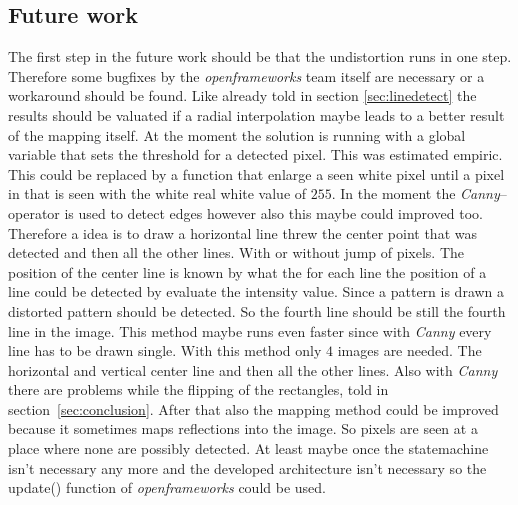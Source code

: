 \documentclass[journal,final,a4paper,twoside]{PS}
\begin{document}
\subsection{Future work}
\label{sec:future}
The first step in the future work should be that the undistortion runs in one step. Therefore some bugfixes by the \emph{openframeworks} team itself are necessary or a workaround should be found. Like already told in section \ref{sec:linedetect} the results should be valuated if a radial interpolation maybe leads to a better result of the mapping itself. At the moment the solution is running with a global variable that sets the threshold for a detected pixel. This was estimated empiric. This could be replaced by a function that enlarge a seen white pixel until a pixel in that is seen with the white real white value of $255$. In the moment the \emph{Canny}--operator is used to detect edges however also this maybe could improved too. Therefore a idea is to draw a horizontal line threw the center point that was detected and then all the other lines. With or without jump of pixels. The position of the center line is known by what the for each line the position of a line could be detected by evaluate the intensity value. Since a pattern is drawn a distorted pattern should be detected. So the fourth line should be still the fourth line in the image. This method maybe runs even faster since with \emph{Canny} every line has to be drawn single. With this method only $4$ images are needed. The horizontal and vertical center line and then all the other lines. Also with \emph{Canny} there are problems while the flipping of the rectangles, told in section~\ref{sec:conclusion}.
After that also the mapping method could be improved because it sometimes maps reflections into the image. So pixels are seen at a place where none are possibly detected.
At least maybe once the statemachine isn't necessary any more and the developed architecture isn't necessary so the update() function of \emph{openframeworks} could be used.  

%
\end{document}
